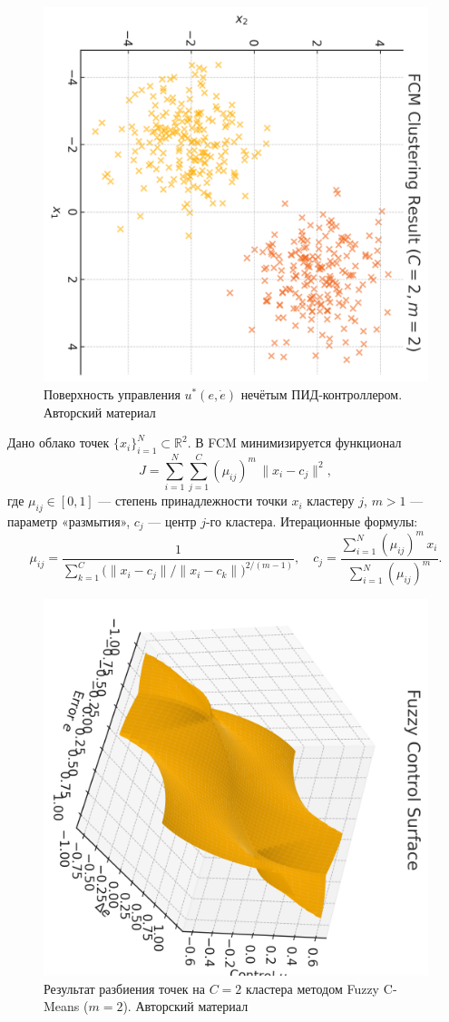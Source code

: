 \begin{figure}[ht]
  \centering
  \includegraphics[width=0.7\linewidth]{images/fuzzy_surface.png}
  \caption{Поверхность управления $u^*(e,\dot e)$ нечётым ПИД‐контроллером. Авторский материал}
  \label{fig:fuzzy-surface}
\end{figure}

\begin{example}
Дано облако точек $\{x_i\}_{i=1}^N\subset\mathbb{R}^2$. В FCM минимизируется функционал
\[
  J = \sum_{i=1}^N \sum_{j=1}^C (\mu_{ij})^m \,\|x_i - c_j\|^2,
\]
где $\mu_{ij}\in[0,1]$ — степень принадлежности точки $x_i$ кластеру $j$, $m>1$ — параметр «размытия», $c_j$ — центр $j$-го кластера.  
Итерационные формулы:
\[
  \mu_{ij}
    = \frac{1}{\sum_{k=1}^C \bigl(\|x_i-c_j\|/\|x_i-c_k\|\bigr)^{2/(m-1)}}, 
  \quad
  c_j
    = \frac{\sum_{i=1}^N (\mu_{ij})^m\,x_i}{\sum_{i=1}^N (\mu_{ij})^m}.
\]
\end{example}

\begin{figure}[ht]
  \centering
  \includegraphics[width=0.7\linewidth]{images/fcm_clusters.png}
  \caption{Результат разбиения точек на $C=2$ кластера методом Fuzzy C‐Means ($m=2$). Авторский материал}
  \label{fig:fcm-clusters}
\end{figure}

